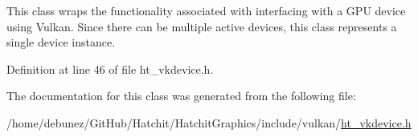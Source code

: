 This class wraps the functionality associated with interfacing with a G\+PU device using Vulkan. Since there can be multiple active devices, this class represents a single device instance. 

Definition at line 46 of file ht\+\_\+vkdevice.\+h.



The documentation for this class was generated from the following file\+:\begin{DoxyCompactItemize}
\item 
/home/debunez/\+Git\+Hub/\+Hatchit/\+Hatchit\+Graphics/include/vulkan/\hyperlink{ht__vkdevice_8h}{ht\+\_\+vkdevice.\+h}\end{DoxyCompactItemize}
